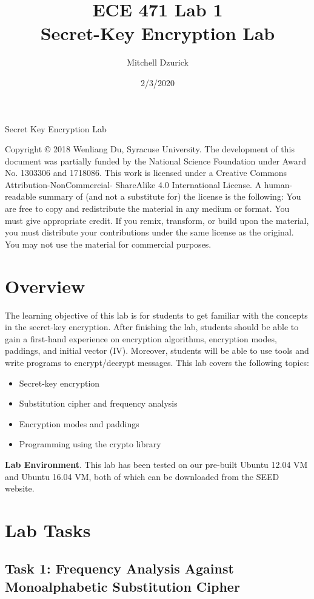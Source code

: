 \documentclass[12pt]{article}
\title {{\bf ECE 471 Lab 1} \\
\large{Secret-Key Encryption Lab}}
\author{Mitchell Dzurick}
\date{2/3/2020}
\begin{document}
\maketitle

\tableofcontents

\clearpage


Secret Key Encryption Lab

Copyright © 2018 Wenliang Du, Syracuse University. The development of this document was partially funded by the National Science Foundation under Award No. 1303306 and 1718086. This work is licensed under a Creative Commons Attribution-NonCommercial- ShareAlike 4.0 International License. A human-readable summary of (and not a substitute for) the license is the following: You are free to copy and redistribute the material in any medium or format. You must give appropriate credit. If you remix, transform, or build upon the material, you must distribute your contributions under the same license as the original. You may not use the material for commercial purposes.

\section{Overview}

The learning objective of this lab is for students to get familiar with the concepts in the secret-key encryption. After finishing the lab, students should be able to gain a first-hand experience on encryption algorithms, encryption modes, paddings, and initial vector (IV). Moreover, students will be able to use tools and write programs to encrypt/decrypt messages. This lab covers the following topics:

    \begin{itemize}
        \item Secret-key encryption
        \item Substitution cipher and frequency analysis
        \item Encryption modes and paddings
        \item Programming using the crypto library
    \end{itemize}

\textbf{Lab Environment}. This lab has been tested on our pre-built Ubuntu 12.04 VM and Ubuntu 16.04 VM, both of which can be downloaded from the SEED website.

\clearpage

\section{Lab Tasks}
\subsection{Task 1: Frequency Analysis Against Monoalphabetic Substitution Cipher}
    
\end{document}
